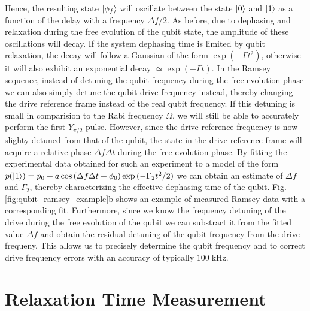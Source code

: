 Hence, the resulting state $\left| \phi_f \right>$ will oscillate between the state $\left| 0 \right>$ and $\left| 1 \right>$ as a function of the delay with a frequency $\Delta f/2$. As before, due to dephasing and relaxation during the free evolution of the qubit state, the amplitude of these oscillations will decay. If the system dephasing time is limited by qubit relaxation, the decay will follow a Gaussian of the form $\exp{(-\Gamma t^2)}$, otherwise it will also exhibit an exponential decay $\simeq \exp{(-\Gamma t)}$. In the Ramsey sequence, instead of detuning the qubit frequency during the free evolution phase we can also simply detune the qubit drive frequency instead, thereby changing the drive reference frame instead of the real qubit frequency. If this detuning is small in comparision to the Rabi frequency $\Omega$, we will still be able to accurately perform the first $Y_{\pi/2}$ pulse. However, since the drive reference frequency is now slighty detuned from that of the qubit, the state in the drive reference frame will acquire a relative phase $\Delta f \Delta t$ during the free evolution phase. By fitting the experimental data obtained for such an experiment to a model of the form $p(\left| 1 \right>) = p_0 +a\cos{(\Delta f \Delta t+\phi_0)}\exp{(-\Gamma_2 t^2/2)}$ we can obtain an estimate of $\Delta f$ and $\Gamma_2$, thereby characterizing the effective dephasing time of the qubit. Fig. \ref{fig:qubit_ramsey_example}b shows an example of measured Ramsey data with a corresponding fit. Furthermore, since we know the frequency detuning of the drive during the free evolution of the qubit we can substract it from the fitted value $\Delta f$ and obtain the residual detuning of the qubit frequency from the drive frequeny. This allows us to precisely determine the qubit frequency and to correct drive frequency errors with an accuracy of typically $100\;\mathrm{kHz}$. 

\section{Relaxation Time Measurement}

